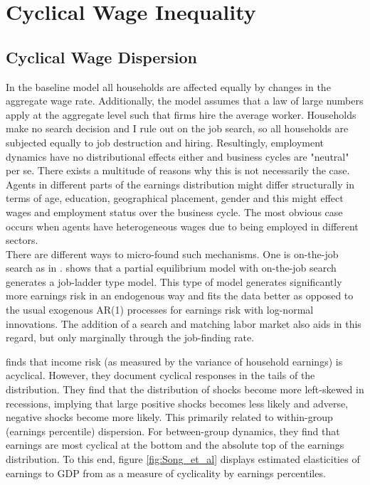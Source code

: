 


\pagebreak 
\section{Cyclical Wage Inequality}
\label{chap:Autostab_base}




\subsection{Cyclical Wage Dispersion} %
In the baseline model all households are affected equally by changes in the aggregate wage rate. Additionally, the model assumes that a law of large numbers apply at the aggregate level such that firms hire the average worker. Households make no search decision and I rule out on the job search, so all households are subjected equally to job destruction and hiring. Resultingly, employment dynamics have no distributional effects either and business cycles are "neutral" per se. There exists a multitude of reasons why this is not necessarily the case. Agents in different parts of the earnings distribution might differ structurally in terms of age, education, geographical placement, gender and this might effect wages and employment status over the business cycle. The most obvious case occurs when agents have heterogeneous wages due to being employed in different sectors. \\

There are different ways to micro-found such mechanisms. One is on-the-job search as in \citet{moscarini2017job}. \citet{hubmer2018job} shows that a partial equilibrium model with on-the-job search generates a job-ladder type model. This type of model generates significantly more earnings risk in an endogenous way and fits the data better as opposed to the usual exogenous AR(1) processes for earnings risk with log-normal innovations. The addition of a search and matching labor market also aids in this regard, but only marginally through the job-finding rate. 



\citet{guvenen2014nature} finds that income risk (as measured by the variance of household earnings) is acyclical. However, they document cyclical responses in the tails of the distribution. They find that the distribution of shocks become more left-skewed in recessions, implying that large positive shocks becomes less likely and adverse, negative shocks become more likely. This primarily related to within-group (earnings percentile) dispersion. For between-group dynamics, they find that earnings are most cyclical at the bottom and the absolute top of the earnings distribution. To this end, figure \ref{fig:Song_et_al} displays estimated elasticities of earnings to GDP from \citet{guvenen2017worker} as a measure of cyclicality by earnings percentiles. 

